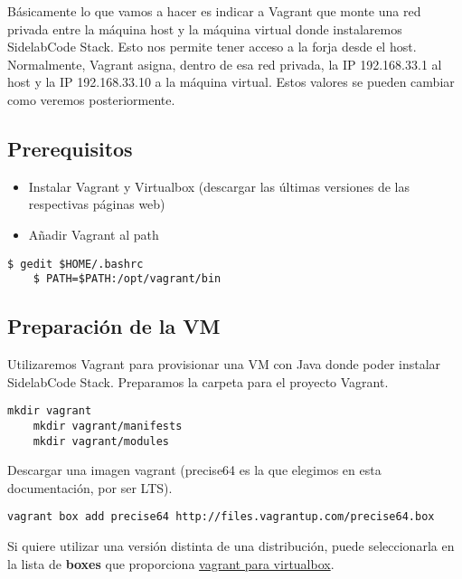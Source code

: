 \par Básicamente lo que vamos a hacer es indicar a Vagrant que monte una red privada entre la máquina host y la máquina virtual donde instalaremos SidelabCode Stack. Esto nos permite tener acceso a la forja desde el host. Normalmente, Vagrant asigna, dentro de esa red privada, la IP 192.168.33.1 al host y la IP 192.168.33.10 a la máquina virtual. Estos valores se pueden cambiar como veremos posteriormente.

\subsection{Prerequisitos}
\label{sub:prerequisitos}

\begin{itemize}
    \item Instalar Vagrant y Virtualbox (descargar las últimas versiones de las respectivas páginas web)
    \item Añadir Vagrant al path
\end{itemize}

\lstset{style=rubybasico}
\begin{lstlisting}[frame=trbl]
    $ gedit $HOME/.bashrc
    $ PATH=$PATH:/opt/vagrant/bin
\end{lstlisting}

\subsection{Preparación de la VM}
\label{preparar-vm}

\par Utilizaremos Vagrant para provisionar una VM con Java donde poder instalar SidelabCode Stack. Preparamos la carpeta para el proyecto Vagrant.

\lstset{style=rubybasico}
\begin{lstlisting}[frame=trbl]
    mkdir vagrant
    mkdir vagrant/manifests
    mkdir vagrant/modules
\end{lstlisting}

\par Descargar una imagen vagrant (precise64 es la que elegimos en esta documentación, por ser LTS).

\lstset{style=rubybasico}
\begin{lstlisting}[frame=trbl]
    vagrant box add precise64 http://files.vagrantup.com/precise64.box
\end{lstlisting}

\par Si quiere utilizar una versión distinta de una distribución, puede seleccionarla en la lista de \textbf{boxes} que proporciona \href{http://www.vagrantbox.es/}{vagrant para virtualbox}.

